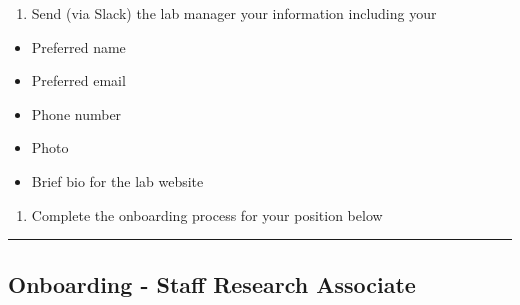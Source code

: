 \documentclass[]{book}
\providecommand{\tightlist}{%
  \setlength{\itemsep}{0pt}\setlength{\parskip}{0pt}}
\begin{document}
\begin{enumerate}
\def\labelenumi{\arabic{enumi}.}
\setcounter{enumi}{2}
\tightlist
\item
  Send (via Slack) the lab manager your information including your
\end{enumerate}

\begin{itemize}
\tightlist
\item
  Preferred name
\item
  Preferred email
\item
  Phone number
\item
  Photo
\item
  Brief bio for the lab website
\end{itemize}

\begin{enumerate}
\def\labelenumi{\arabic{enumi}.}
\setcounter{enumi}{3}
\tightlist
\item
  Complete the onboarding process for your position below
\end{enumerate}

\begin{center}\rule{0.5\linewidth}{\linethickness}\end{center}

\hypertarget{onboarding---staff-research-associate}{%
\subsection{Onboarding - Staff Research Associate}\label{onboarding---staff-research-associate}}
\end{document}
